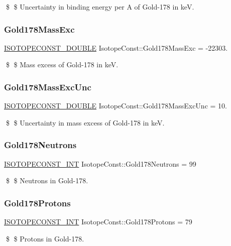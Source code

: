 \$ \$ Uncertainty in binding energy per A of Gold-\/178 in keV. \mbox{\label{group___isotope_const-_gold-_au178_gaf3fa1b63fa6f4c30ade91d41af35bdc4}} 
\subsubsection{\texorpdfstring{Gold178\+Mass\+Exc}{Gold178MassExc}}
{\footnotesize\ttfamily \mbox{\hyperlink{group___isotope_const-_macros_ga8f45a7272ce02c0b4c65c44636ed719a}{I\+S\+O\+T\+O\+P\+E\+C\+O\+N\+S\+T\+\_\+\+D\+O\+U\+B\+LE}} Isotope\+Const\+::\+Gold178\+Mass\+Exc = -\/22303.}

\$ \$ Mass excess of Gold-\/178 in keV. \mbox{\label{group___isotope_const-_gold-_au178_ga3c2bd4829c19e3097c985e90f6e1ec86}} 
\subsubsection{\texorpdfstring{Gold178\+Mass\+Exc\+Unc}{Gold178MassExcUnc}}
{\footnotesize\ttfamily \mbox{\hyperlink{group___isotope_const-_macros_ga8f45a7272ce02c0b4c65c44636ed719a}{I\+S\+O\+T\+O\+P\+E\+C\+O\+N\+S\+T\+\_\+\+D\+O\+U\+B\+LE}} Isotope\+Const\+::\+Gold178\+Mass\+Exc\+Unc = 10.}

\$ \$ Uncertainty in mass excess of Gold-\/178 in keV. \mbox{\label{group___isotope_const-_gold-_au178_ga73c46fa2cbd846f3ba7d72ea4b63a835}} 
\subsubsection{\texorpdfstring{Gold178\+Neutrons}{Gold178Neutrons}}
{\footnotesize\ttfamily \mbox{\hyperlink{group___isotope_const-_macros_ga5f18360b3e99483a35c32d789e62621c}{I\+S\+O\+T\+O\+P\+E\+C\+O\+N\+S\+T\+\_\+\+I\+NT}} Isotope\+Const\+::\+Gold178\+Neutrons = 99}

\$ \$ Neutrons in Gold-\/178. \mbox{\label{group___isotope_const-_gold-_au178_ga8413b41724d5d9a8403087a3dbaee4da}} 
\subsubsection{\texorpdfstring{Gold178\+Protons}{Gold178Protons}}
{\footnotesize\ttfamily \mbox{\hyperlink{group___isotope_const-_macros_ga5f18360b3e99483a35c32d789e62621c}{I\+S\+O\+T\+O\+P\+E\+C\+O\+N\+S\+T\+\_\+\+I\+NT}} Isotope\+Const\+::\+Gold178\+Protons = 79}

\$ \$ Protons in Gold-\/178. 